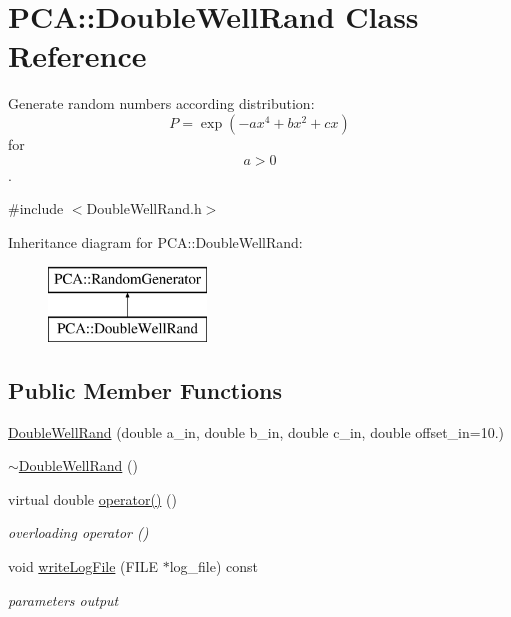 \hypertarget{class_p_c_a_1_1_double_well_rand}{}\section{P\+CA\+:\+:Double\+Well\+Rand Class Reference}
\label{class_p_c_a_1_1_double_well_rand}


Generate random numbers according distribution\+: \[ P = \exp(-ax^4+bx^2+cx) \] for \[ a>0 \].  




{\ttfamily \#include $<$Double\+Well\+Rand.\+h$>$}

Inheritance diagram for P\+CA\+:\+:Double\+Well\+Rand\+:\begin{figure}[H]
\begin{center}
\leavevmode
\includegraphics[height=2.000000cm]{class_p_c_a_1_1_double_well_rand}
\end{center}
\end{figure}
\subsection*{Public Member Functions}
\begin{DoxyCompactItemize}
\item 
\hyperlink{class_p_c_a_1_1_double_well_rand_a5a804723b5487331965c41acfaed8f0a}{Double\+Well\+Rand} (double a\+\_\+in, double b\+\_\+in, double c\+\_\+in, double offset\+\_\+in=10.)
\item 
\hyperlink{class_p_c_a_1_1_double_well_rand_aafd6d9bf8587eda1cb46e45686cf772a}{$\sim$\+Double\+Well\+Rand} ()
\item 
virtual double \hyperlink{class_p_c_a_1_1_double_well_rand_a13beb4ae56cd6ccb1d6e4c1e2a03ff9b}{operator()} ()
\begin{DoxyCompactList}\small\item\em overloading operator () \end{DoxyCompactList}\item 
void \hyperlink{class_p_c_a_1_1_double_well_rand_aead9619d86b833eb5d9753a94294bc93}{write\+Log\+File} (F\+I\+LE $\ast$log\+\_\+file) const
\begin{DoxyCompactList}\small\item\em parameters output \end{DoxyCompactList}\end{DoxyCompactItemize}

